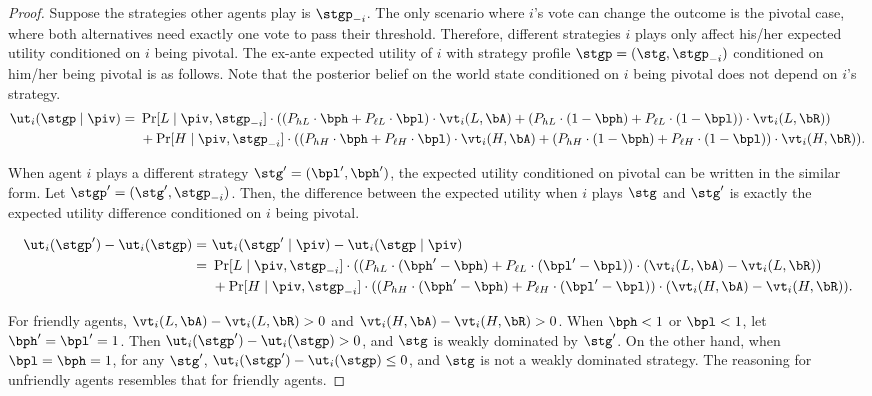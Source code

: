 \begin{proof}
    Suppose the strategies other agents play is $\stgp_{-i}$. The only scenario where $i$'s vote can change the outcome is the pivotal case, where both alternatives need exactly one vote to pass their threshold. Therefore, different strategies $i$ plays only affect his/her expected utility conditioned on $i$ being pivotal. The ex-ante expected utility of $i$ with strategy profile $\stgp = (\stg, \stgp_{-i})$ conditioned on him/her being pivotal is as follows. Note that the posterior belief on the world state conditioned on $i$ being pivotal does not depend on $i$'s strategy. 
    \begin{align*}
        \ut_{i}(\stgp \mid \piv) =&\ \Pr[L\mid \piv, \stgp_{-i}] \cdot ((P_{hL}\cdot \bph + P_{\ell L}\cdot \bpl)\cdot\vt_{i}(L, \bA) + (P_{hL}\cdot (1-\bph) + P_{\ell L}\cdot (1-\bpl))\cdot \vt_{i}(L, \bR)) \\
        &\ +  \Pr[H\mid \piv, \stgp_{-i}]\cdot ((P_{hH}\cdot \bph + P_{\ell H}\cdot \bpl)\cdot\vt_{i}(H, \bA) + (P_{hH}\cdot (1-\bph) + P_{\ell H}\cdot (1-\bpl))\cdot \vt_{i}(H, \bR)). 
    \end{align*}

    When agent $i$ plays a different strategy $\stg' = (\bpl', \bph')$, the expected utility conditioned on pivotal can be written in the similar form. Let $\stgp' = (\stg', \stgp_{-i})$. Then, the difference between the expected utility when $i$ plays $\stg$ and $\stg'$ is exactly the expected utility difference conditioned on $i$ being pivotal.

    \begin{align*}
        \ut_i(\stgp') - \ut_i(\stgp) = &\ \ut_i(\stgp' \mid \piv) - \ut_i(\stgp \mid \piv) \\
        =&\ \Pr[L \mid \piv, \stgp_{-i}] \cdot ((P_{hL} \cdot (\bph' - \bph) + P_{\ell L} \cdot (\bpl' - \bpl))\cdot (\vt_i(L, \bA) - \vt_i(L, \bR))\\
        &\ + \Pr[H \mid \piv, \stgp_{-i}] \cdot ((P_{hH} \cdot (\bph' - \bph) + P_{\ell H} \cdot (\bpl' - \bpl))\cdot (\vt_i(H, \bA) - \vt_i(H, \bR)). 
    \end{align*}

For friendly agents, $\vt_i(L, \bA) - \vt_i(L, \bR) > 0$ and $\vt_i(H, \bA) - \vt_i(H, \bR) > 0$. When $\bph < 1$ or $\bpl < 1$, let $\bph' = \bpl' = 1$. Then $\ut_i(\stgp') - \ut_i(\stgp) > 0$, and $\stg$ is weakly dominated by $\stg'$. On the other hand, when $\bpl = \bph = 1$, for any $\stg'$, $\ut_i(\stgp') - \ut_i(\stgp) \le 0$, and $\stg$ is not a weakly dominated strategy. The reasoning for unfriendly agents resembles that for friendly agents. 


\end{proof}
